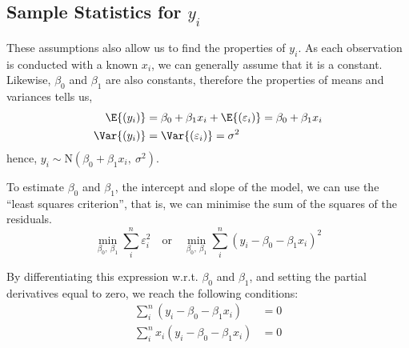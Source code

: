 \documentclass{article}
\begin{document}
\subsection{Sample Statistics for \texorpdfstring{\(y_i\)}{yi}}
These assumptions also allow us to find the properties of \(y_i\). As each observation is conducted with a known \(x_i\), we can generally assume that it is a constant.
Likewise, \(\beta_0\) and \(\beta_1\) are also constants, therefore the properties of means and variances tells us,
\begin{align*}
    \E{\left( y_i \right)}   & = \beta_0 + \beta_1 x_i + \E{\left( \varepsilon_i \right)} = \beta_0 + \beta_1 x_i \\
    \Var{\left( y_i \right)} & = \Var{\left( \varepsilon_i \right)} = \sigma^2
\end{align*}
hence, \(y_i \sim \mathrm{N}\left( \beta_0 + \beta_1 x_i,\: \sigma^2 \right)\).
\begin{definition}
    To estimate \(\beta_0\) and \(\beta_1\), the intercept and slope of the model,
    we can use the ``least squares criterion'',
    that is, we can minimise the sum of the squares of the residuals.
    \begin{equation*}
        \min_{\beta_0,\: \beta_1}\sum_i^n \varepsilon_i^2 \quad \text{or} \quad \min_{\beta_0,\: \beta_1}\sum_i^n \left( y_i - \beta_0 - \beta_1 x_i \right)^2
    \end{equation*}
\end{definition}
By differentiating this expression w.r.t. \(\beta_0\) and \(\beta_1\), and setting the partial derivatives equal to zero, we reach the following conditions:
\begin{align*}
    \sum_i^n \left( y_i - \beta_0 - \beta_1 x_i \right)    & = 0 \\
    \sum_i^n x_i\left( y_i - \beta_0 - \beta_1 x_i \right) & = 0
\end{align*}
\end{document}
